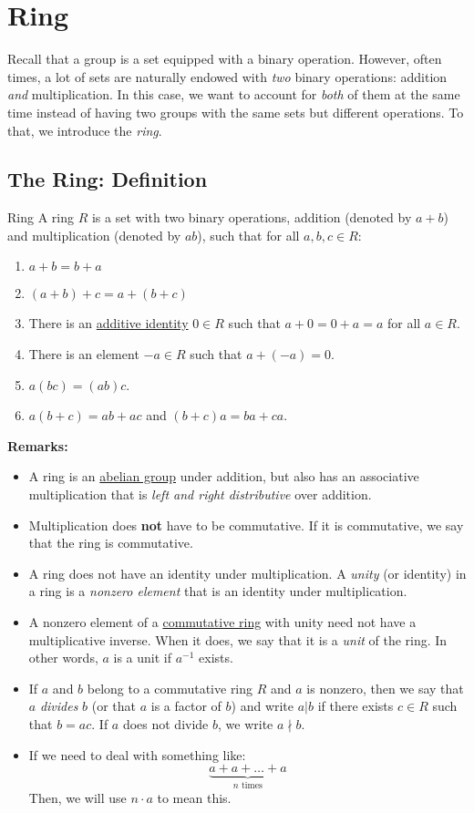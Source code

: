 \documentclass[letterpaper]{article}
\begin{document}
\section{Ring}
Recall that a group is a set equipped with a binary operation. However, often times, a lot of sets are naturally endowed with \emph{two} binary operations: addition \emph{and} multiplication. In this case, we want to account for \emph{both} of them at the same time instead of having two groups with the same sets but different operations. To that, we introduce the \emph{ring}.

\subsection{The Ring: Definition}

\begin{definition}{Ring}{}
    A ring $R$ is a set with two binary operations, addition (denoted by $a + b$) and multiplication (denoted by $ab$), such that for all $a, b, c \in R$:
    \begin{enumerate}
        \item $a + b = b + a$
        \item $(a + b) + c = a + (b + c)$
        \item There is an \underline{additive identity} $0 \in R$ such that $a + 0 = 0 + a = a$ for all $a \in R$.
        \item There is an element $-a \in R$ such that $a + (-a) = 0$. 
        \item $a(bc) = (ab)c$. 
        \item $a(b + c) = ab + ac$ and $(b + c)a = ba + ca$.  
    \end{enumerate}
\end{definition}
\textbf{Remarks:}
\begin{itemize}
    \item A ring is an \underline{abelian group} under addition, but also has an associative multiplication that is \emph{left and right distributive} over addition.
    \item Multiplication does \textbf{not} have to be commutative. If it is commutative, we say that the ring is commutative.
    \item A ring does not have an identity under multiplication. A \emph{unity} (or identity) in a ring is a \emph{nonzero element} that is an identity under multiplication.
    \item A nonzero element of a \underline{commutative ring} with unity need not have a multiplicative inverse. When it does, we say that it is a \emph{unit} of the ring. In other words, $a$ is a unit if $a^{-1}$ exists. 
    \item If $a$ and $b$ belong to a commutative ring $R$ and $a$ is nonzero, then we say that $a$ \emph{divides} $b$ (or that $a$ is a factor of $b$) and write $a | b$ if there exists $c \in R$ such that $b = ac$. If $a$ does not divide $b$, we write $a \nmid b$.
    \item If we need to deal with something like:
    \[\underbrace{a + a + \dots + a}_{n \text{ times}}\]
    Then, we will use $n \cdot a$ to mean this. 
\end{itemize}
\end{document}
